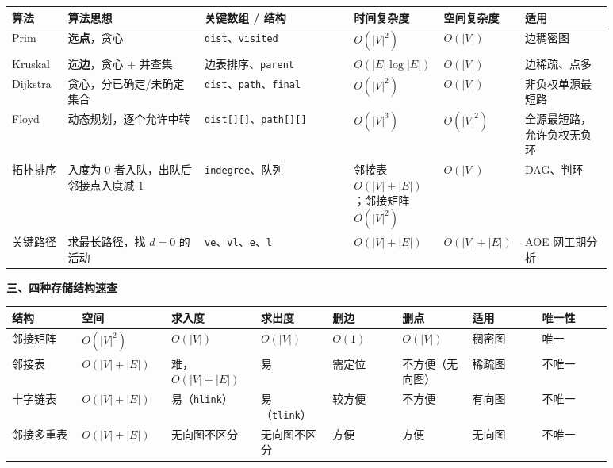 \documentclass[11pt,openany,UTF8]{ctexbook}
\begin{document}
\begingroup\small\setlength{\tabcolsep}{4.0pt}
\begin{longtable}{@{}L{0.0997\linewidth}L{0.2258\linewidth}L{0.2464\linewidth}L{0.0821\linewidth}L{0.0821\linewidth}L{0.1408\linewidth}@{}}
\toprule
\textbf{算法} & \textbf{算法思想} & \textbf{关键数组 / 结构} & \textbf{时间复杂度} & \textbf{空间复杂度} & \textbf{适用} \\
\midrule
\endhead
Prim & 选\textbf{点}，贪心 & \texttt{dist}、\texttt{visited} & $O(\lvert V\rvert^{2})$ & $O(\lvert V\rvert)$ & 边稠密图 \\
Kruskal & 选\textbf{边}，贪心 + 并查集 & 边表排序、\texttt{parent} & $O(\lvert E\rvert\log\lvert E\rvert)$ & $O(\lvert V\rvert)$ & 边稀疏、点多 \\
Dijkstra & 贪心，分已确定/未确定集合 & \texttt{dist}、\texttt{path}、\texttt{final} & $O(\lvert V\rvert^{2})$ & $O(\lvert V\rvert)$ & 非负权单源最短路 \\
Floyd & 动态规划，逐个允许中转 & \texttt{dist[]\allowbreak{}[]\allowbreak{}}、\texttt{path[]\allowbreak{}[]\allowbreak{}} & $O(\lvert V\rvert^{3})$ & $O(\lvert V\rvert^{2})$ & 全源最短路，允许负权无负环 \\
拓扑排序 & 入度为 0 者入队，出队后邻接点入度减 1 & \texttt{indegree}、队列 & 邻接表 $O(\lvert V\rvert+\lvert E\rvert)$；邻接矩阵 $O(\lvert V\rvert^{2})$ & $O(\lvert V\rvert)$ & DAG、判环 \\
关键路径 & 求最长路径，找 $d=0$ 的活动 & \texttt{ve}、\texttt{vl}、\texttt{e}、\texttt{l} & $O(\lvert V\rvert+\lvert E\rvert)$ & $O(\lvert V\rvert+\lvert E\rvert)$ & AOE 网工期分析 \\
\bottomrule
\end{longtable}
\endgroup

\textbf{三、四种存储结构速查}

\begingroup\small\setlength{\tabcolsep}{3.0pt}
\begin{longtable}{@{}L{0.1096\linewidth}L{0.1096\linewidth}L{0.1096\linewidth}L{0.1096\linewidth}L{0.1096\linewidth}L{0.1096\linewidth}L{0.1096\linewidth}L{0.1096\linewidth}@{}}
\toprule
\textbf{结构} & \textbf{空间} & \textbf{求入度} & \textbf{求出度} & \textbf{删边} & \textbf{删点} & \textbf{适用} & \textbf{唯一性} \\
\midrule
\endhead
邻接矩阵 & $O(\lvert V\rvert^{2})$ & $O(\lvert V\rvert)$ & $O(\lvert V\rvert)$ & $O(1)$ & $O(\lvert V\rvert)$ & 稠密图 & 唯一 \\
邻接表 & $O(\lvert V\rvert+\lvert E\rvert)$ & 难，$O(\lvert V\rvert+\lvert E\rvert)$ & 易 & 需定位 & 不方便（无向图） & 稀疏图 & 不唯一 \\
十字链表 & $O(\lvert V\rvert+\lvert E\rvert)$ & 易（\texttt{hlink}） & 易（\texttt{tlink}） & 较方便 & 不方便 & 有向图 & 不唯一 \\
邻接多重表 & $O(\lvert V\rvert+\lvert E\rvert)$ & 无向图不区分 & 无向图不区分 & 方便 & 方便 & 无向图 & 不唯一 \\
\bottomrule
\end{longtable}
\endgroup
\end{document}
